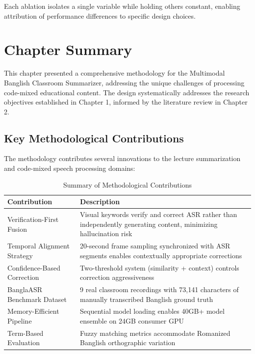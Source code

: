 Each ablation isolates a single variable while holding others constant, enabling attribution of performance differences to specific design choices.

\section{Chapter Summary}
\label{sec:chapter_summary}

This chapter presented a comprehensive methodology for the Multimodal Banglish Classroom Summarizer, addressing the unique challenges of processing code-mixed educational content. The design systematically addresses the research objectives established in Chapter 1, informed by the literature review in Chapter 2.

\subsection{Key Methodological Contributions}

The methodology contributes several innovations to the lecture summarization and code-mixed speech processing domains:

\begin{table}[h]
\centering
\caption{Summary of Methodological Contributions}
\label{tab:methodology_contributions}
\begin{tabular}{|p{3.5cm}|p{8cm}|}
\hline
\textbf{Contribution} & \textbf{Description} \\
\hline
Verification-First Fusion & Visual keywords verify and correct ASR rather than independently generating content, minimizing hallucination risk \\
\hline
Temporal Alignment Strategy & 20-second frame sampling synchronized with ASR segments enables contextually appropriate corrections \\
\hline
Confidence-Based Correction & Two-threshold system (similarity + context) controls correction aggressiveness \\
\hline
BanglaASR Benchmark Dataset & 9 real classroom recordings with 73,141 characters of manually transcribed Banglish ground truth \\
\hline
Memory-Efficient Pipeline & Sequential model loading enables 40GB+ model ensemble on 24GB consumer GPU \\
\hline
Term-Based Evaluation & Fuzzy matching metrics accommodate Romanized Banglish orthographic variation \\
\hline
\end{tabular}
\end{table}

